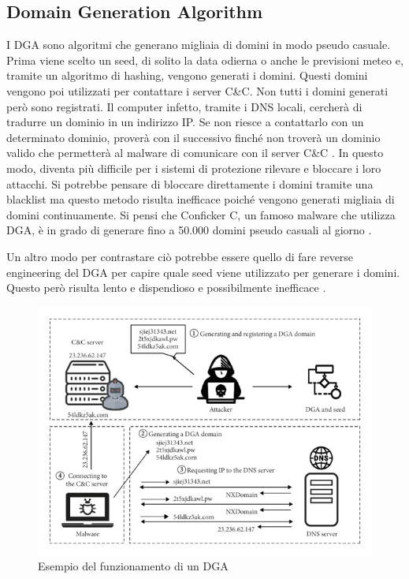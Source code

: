 \documentclass[12pt,a4paper,openright,twoside]{book}
\begin{document}
\subsection{Domain Generation Algorithm}


I \acrshort{DGA} sono algoritmi che generano migliaia di domini in modo pseudo casuale.
Prima viene scelto un seed, di solito la data odierna
o anche le previsioni meteo \cite{8621875} e, tramite
un algoritmo di hashing, vengono generati i domini.
Questi domini vengono poi utilizzati per contattare i server \acrshort{C&C}.
Non tutti i domini generati però sono registrati.
Il computer infetto, tramite i DNS locali, cercherà di tradurre
un dominio in un indirizzo IP.
Se non riesce a contattarlo con un determinato dominio,
proverà con il successivo finché non troverà
un dominio valido che permetterà al malware di comunicare con
il server \acrshort{C&C} \cite{8489147}.
In questo modo, diventa più difficile per i sistemi di protezione
rilevare e bloccare i loro attacchi.
Si potrebbe pensare di bloccare direttamente i domini tramite
una blacklist ma questo metodo
risulta inefficace poiché vengono generati migliaia di domini
continuamente. Si pensi che Conficker C, un famoso malware
che utilizza \acrshort{DGA}, è in grado di generare
fino a 50.000 domini pseudo casuali al giorno \cite{978131}.

Un altro modo per contrastare ciò
potrebbe essere quello di fare reverse engineering
del \acrshort{DGA} per capire quale seed viene utilizzato per generare i domini.
Questo però risulta lento e dispendioso e possibilmente inefficace \cite{8887881}.

\begin{figure}
    \centering
    \includegraphics[width=.8\linewidth]{figures/DGA example.jpg}
    \caption{Esempio del funzionamento di un \acrshort{DGA} \cite{8887881}}
    \label{fig:DGA example}
\end{figure}
\end{document}
